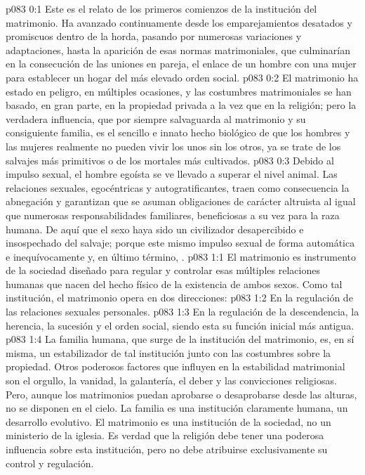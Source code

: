 \author{Jefe de los serafines}
\vs p083 0:1 Este es el relato de los primeros comienzos de la institución del matrimonio. Ha avanzado continuamente desde los emparejamientos desatados y promiscuos dentro de la horda, pasando por numerosas variaciones y adaptaciones, hasta la aparición de esas normas matrimoniales, que culminarían en la consecución de las uniones en pareja, el enlace de un hombre con una mujer para establecer un hogar del más elevado orden social.
\vs p083 0:2 El matrimonio ha estado en peligro, en múltiples ocasiones, y las costumbres matrimoniales se han basado, en gran parte, en la propiedad privada a la vez que en la religión; pero la verdadera influencia, que por siempre salvaguarda al matrimonio y su consiguiente familia, es el sencillo e innato hecho biológico de que los hombres y las mujeres realmente no pueden vivir los unos sin los otros, ya se trate de los salvajes más primitivos o de los mortales más cultivados.
\vs p083 0:3 Debido al impulso sexual, el hombre egoísta se ve llevado a superar el nivel animal. Las relaciones sexuales, egocéntricas y autogratificantes, traen como consecuencia la abnegación y garantizan que se asuman obligaciones de carácter altruista al igual que numerosas responsabilidades familiares, beneficiosas a su vez para la raza humana. De aquí que el sexo haya sido un civilizador desapercibido e insospechado del salvaje; porque este mismo impulso sexual de forma automática e inequívocamente  y, en último término, .
\vs p083 1:1 El matrimonio es instrumento de la sociedad diseñado para regular y controlar esas múltiples relaciones humanas que nacen del hecho físico de la existencia de ambos sexos. Como tal institución, el matrimonio opera en dos direcciones:
\vs p083 1:2 En la regulación de las relaciones sexuales personales.
\vs p083 1:3 En la regulación de la descendencia, la herencia, la sucesión y el orden social, siendo esta su función inicial más antigua.
\vs p083 1:4 \pc La familia humana, que surge de la institución del matrimonio, es, en sí misma, un estabilizador de tal institución junto con las costumbres sobre la propiedad. Otros poderosos factores que influyen en la estabilidad matrimonial son el orgullo, la vanidad, la galantería, el deber y las convicciones religiosas. Pero, aunque los matrimonios puedan aprobarse o desaprobarse desde las alturas, no se disponen en el cielo. La familia es una institución claramente humana, un desarrollo evolutivo. El matrimonio es una institución de la sociedad, no un ministerio de la iglesia. Es verdad que la religión debe tener una poderosa influencia sobre esta institución, pero no debe atribuirse exclusivamente su control y regulación.
